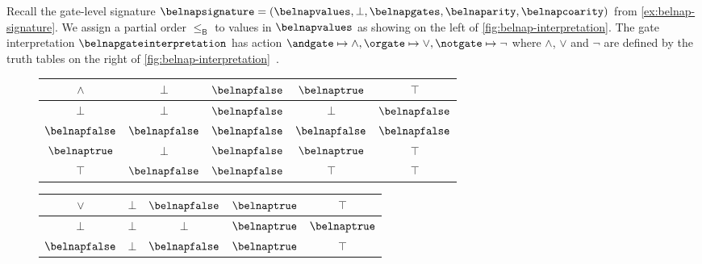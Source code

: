 \documentclass{lmcs}
\begin{document}
\begin{exa}\label{ex:belnap-interpretation}
    Recall the gate-level signature \(
    \belnapsignature = (
    \belnapvalues, \bot, \belnapgates, \belnaparity, \belnapcoarity
    )
    \) from \autoref{ex:belnap-signature}.
    We assign a partial order \(\leq_\mathsf{B}\) to values in
    \(\belnapvalues\) as showing on the left of
    \autoref{fig:belnap-interpretation}.
    The gate interpretation \(\belnapgateinterpretation\) has action \(
    \andgate \mapsto \land, \orgate \mapsto \lor, \notgate \mapsto \neg
    \) where \(\land\), \(\lor\) and \(\neg\) are defined by the truth tables
    on the right of \autoref{fig:belnap-interpretation}~\cite{belnap1977useful}.

    \begin{figure*}
        \centering
        \qquad\qquad
        \begin{tabular}{|c|cccc|}
            \hline
            \(\land\)        & \(\bot\)         & \(\belnapfalse\) & \(\belnaptrue\)  & \(\top\)         \\
            \hline
            \(\bot\)         & \(\bot\)         & \(\belnapfalse\) & \(\bot\)         & \(\belnapfalse\) \\
            \(\belnapfalse\) & \(\belnapfalse\) & \(\belnapfalse\) & \(\belnapfalse\) & \(\belnapfalse\) \\
            \(\belnaptrue\)  & \(\bot\)         & \(\belnapfalse\) & \(\belnaptrue\)  & \(\top\)         \\
            \(\top\)         & \(\belnapfalse\) & \(\belnapfalse\) & \(\top\)         & \(\top\)         \\
            \hline
        \end{tabular}
        \quad
        \begin{tabular}{|c|cccc|}
            \hline
            \(\lor\)         & \(\bot\)        & \(\belnapfalse\) & \(\belnaptrue\) & \(\top\)        \\
            \hline
            \(\bot\)         & \(\bot\)        & \(\bot\)         & \(\belnaptrue\) & \(\belnaptrue\) \\
            \(\belnapfalse\) & \(\bot\)        & \(\belnapfalse\) & \(\belnaptrue\) & \(\top\)        \\

\end{tabular}
\end{figure*}
\end{exa}
\end{document}
